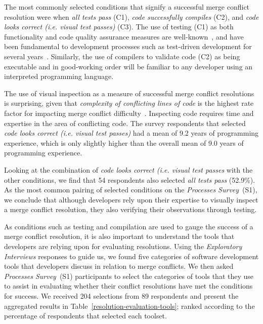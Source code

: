 The most commonly selected conditions that signify a successful merge conflict resolution were when \textit{all tests pass} (C1), \textit{code successfully compiles} (C2), and \textit{code looks correct (i.e. visual test passes)} (C3).
The use of testing (C1) as both functionality and code quality assurance measures are well-known~\cite{beizer1984software}\cite{tian2005software}, and have been fundamental to  development processes such as test-driven development for several years~\cite{beck2003test}.
Similarly, the use of compilers to validate code (C2) as being executable and in good-working order will be familiar to any developer using an interpreted programming language.

The use of visual inspection as a measure of successful merge conflict resolutions is surprising, given that \textit{complexity of conflicting lines of code} is the highest rate factor for impacting merge conflict difficulty~\cite{mckee2017software}.
Inspecting code requires time and expertise in the area of conflicting code.
The survey respondents that selected \textit{code looks correct (i.e. visual test passes)} had a mean of 9.2 years of programming experience, which is only slightly higher than the overall mean of 9.0 years of programming experience.

Looking at the combination of \textit{code looks correct (i.e. visual test passes} with the other conditions, we find that 54 respondents also selected \textit{all tests pass} (52.9\%).
As the most common pairing of selected conditions on the \textit{Processes Survey}~(S1), we conclude that although developers rely upon their expertise to visually inspect a merge conflict resolution, they also verifying their observations through testing.


As conditions such as testing and compilation are used to gauge the success of a merge conflict resolution, it is also important to understand the tools that developers are relying upon for evaluating resolutions.
Using the \textit{Exploratory Interviews} responses to guide us, we found five categories of software development tools that developers discuss in relation to merge conflicts.
We then asked \textit{Processes Survey}~(S1) participants to select the categories of tools that they use to assist in evaluating whether their conflict resolutions have met the conditions for success.
We received 204 selections from 89 respondents and present the aggregated results in Table~\ref{resolution-evaluation-tools}; ranked according to the percentage of respondents that selected each toolset.

